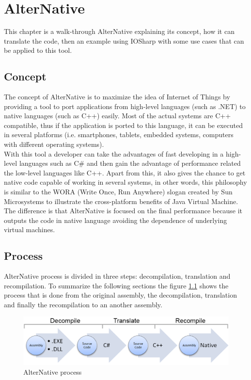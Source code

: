 \chapter{AlterNative}\label{C:AlterNative}
This chapter is a walk-through AlterNative explaining its concept, how it can translate the code, then an example using IOSharp with some use cases that can be applied to this tool.
\section{Concept}\label{S:AN-Concept}
The concept of AlterNative is to maximize the idea of Internet of Things by providing a tool to port applications from high-level languages (such as .NET) to native languages (such as C++) easily. Most of the actual systems are C++ compatible, thus if the application is ported to this language, it can be executed in several platforms (i.e. smartphones, tablets, embedded systems, computers with different operating systems).
\\
With this tool a developer can take the advantages of fast developing in a high-level languages such as C\# and then gain the advantage of performance related the low-level languages like C++. Apart from this, it also gives the chance to get native code capable of working in several systems, in other words, this philosophy is similar to the WORA (Write Once, Run Anywhere) slogan created by Sun Microsystems to illustrate the cross-platform benefits of Java Virtual Machine. The difference is that AlterNative is focused on the final performance because it outputs the code in native language avoiding the dependence of underlying virtual machines.
\section{Process}\label{S:AN-Process}
AlterNative process is divided in three steps: decompilation, translation and recompilation.
To summarize the following sections the figure \ref{fig:AN-Process} shows the process that is done from the original assembly, the decompilation, translation and finally the recompilation to an another assembly.
\begin{figure}[H]\begin{center}
 \centering
  \captionsetup{justification=centering}
  \includegraphics[width=1\textwidth]{pictures/alternative/process}
  \caption{AlterNative process\label{fig:AN-Process}}
\end{center}\end{figure}

